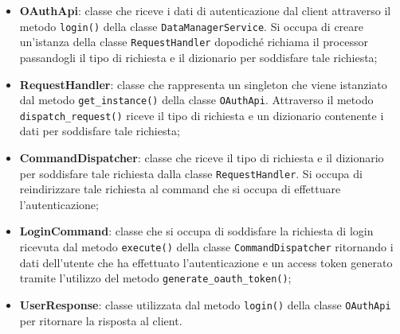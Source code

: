     \begin{itemize}
        \item \textbf{OAuthApi}: classe che riceve i dati di autenticazione dal client attraverso il metodo \texttt{login()} della classe \texttt{DataManagerService}. Si occupa di creare un'istanza della classe \texttt{RequestHandler} dopodiché richiama il processor passandogli il tipo di richiesta e il dizionario per soddisfare tale richiesta;
        \item \textbf{RequestHandler}: classe che rappresenta un singleton che viene istanziato dal metodo \texttt{get\_instance()} della classe \texttt{OAuthApi}. Attraverso il metodo \texttt{dispatch\_request()} riceve il tipo di richiesta e un dizionario contenente i dati per soddisfare tale richiesta;
        \item \textbf{CommandDispatcher}: classe che riceve il tipo di richiesta e il dizionario per soddisfare tale richiesta dalla classe \texttt{RequestHandler}. Si occupa di reindirizzare tale richiesta al command che si occupa di effettuare l'autenticazione;
        \item \textbf{LoginCommand}: classe che si occupa di soddisfare la richiesta di login ricevuta dal metodo \texttt{execute()} della classe \texttt{CommandDispatcher} ritornando i dati dell'utente che ha effettuato l'autenticazione e un access token generato tramite l'utilizzo del metodo \texttt{generate\_oauth\_token()};
        \item \textbf{UserResponse}: classe utilizzata dal metodo \texttt{login()} della classe \texttt{OAuthApi} per ritornare la risposta al client.
    \end{itemize}


